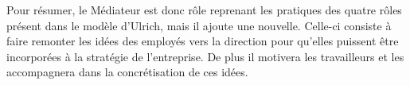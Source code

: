 Pour résumer, le \og{}Médiateur\fg{} est donc rôle reprenant les pratiques des quatre rôles présent dans le modèle d'Ulrich, mais il ajoute une nouvelle. Celle-ci consiste à faire remonter les idées des employés vers la direction pour qu'elles puissent être incorporées à la stratégie de l'entreprise. De plus il motivera les travailleurs et les accompagnera dans la concrétisation de ces idées. 